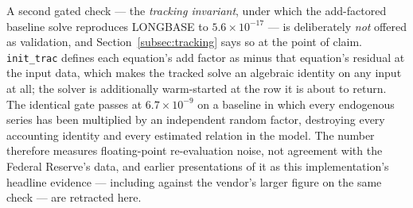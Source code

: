 A second gated check --- the \emph{tracking invariant}, under which the add-factored baseline solve reproduces LONGBASE to $5.6\times10^{-17}$ --- is deliberately \emph{not} offered as validation, and Section~\ref{subsec:tracking} says so at the point of claim. \texttt{init\_trac} defines each equation's add factor as minus that equation's residual at the input data, which makes the tracked solve an algebraic identity on any input at all; the solver is additionally warm-started at the row it is about to return. The identical gate passes at $6.7\times10^{-9}$ on a baseline in which every endogenous series has been multiplied by an independent random factor, destroying every accounting identity and every estimated relation in the model. The number therefore measures floating-point re-evaluation noise, not agreement with the Federal Reserve's data, and earlier presentations of it as this implementation's headline evidence --- including against the vendor's larger figure on the same check --- are retracted here.

